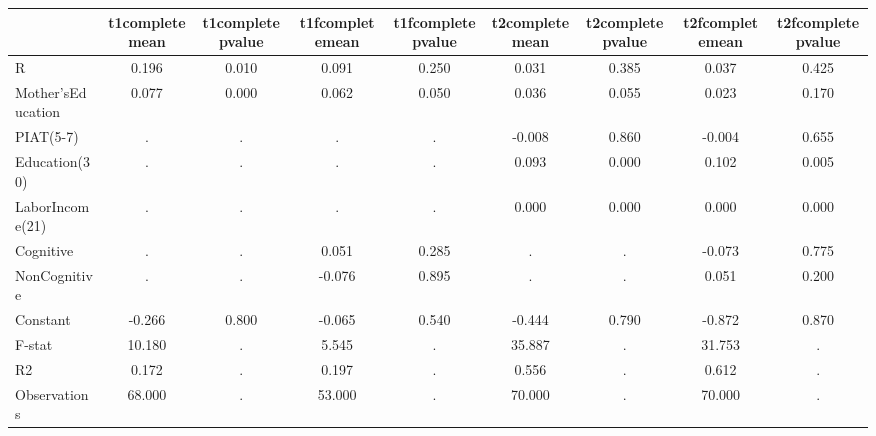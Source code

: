 \begin{table}[htbp]
\begin{tabular}{lcccccccc} \hline \hline
 & t1completemean  & t1completepvalue  & t1fcompletemean  & t1fcompletepvalue  & t2completemean  & t2completepvalue  & t2fcompletemean  & t2fcompletepvalue  \\  \hline 
R &     0.196 &     0.010 &     0.091 &     0.250 &     0.031 &     0.385 &     0.037 &     0.425 \\  
Mother'sEducation &     0.077 &     0.000 &     0.062 &     0.050 &     0.036 &     0.055 &     0.023 &     0.170 \\  
PIAT(5-7) &         . &         . &         . &         . &    -0.008 &     0.860 &    -0.004 &     0.655 \\  
Education(30) &         . &         . &         . &         . &     0.093 &     0.000 &     0.102 &     0.005 \\  
LaborIncome(21) &         . &         . &         . &         . &     0.000 &     0.000 &     0.000 &     0.000 \\  
Cognitive &         . &         . &     0.051 &     0.285 &         . &         . &    -0.073 &     0.775 \\  
NonCognitive &         . &         . &    -0.076 &     0.895 &         . &         . &     0.051 &     0.200 \\  
Constant &    -0.266 &     0.800 &    -0.065 &     0.540 &    -0.444 &     0.790 &    -0.872 &     0.870 \\  
F-stat &    10.180 &         . &     5.545 &         . &    35.887 &         . &    31.753 &         . \\  
R2 &     0.172 &         . &     0.197 &         . &     0.556 &         . &     0.612 &         . \\  
Observations &    68.000 &         . &    53.000 &         . &    70.000 &         . &    70.000 &         . \\  
\hline \hline \end{tabular}
\end{table}
